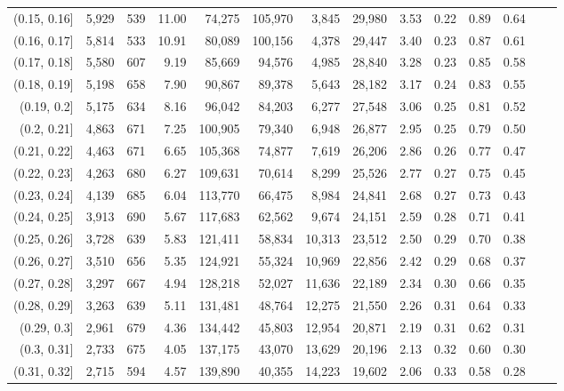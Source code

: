 \begin{tabular}{rrrrrrrrrrrrrr}
(0.15, 0.16]   &  5,929 &  539 &   11.00 &   74,275 &  105,970 &   3,845 &  29,980 &  3.53 &  0.22 &  0.89 &      0.64 \\
(0.16, 0.17]   &  5,814 &  533 &   10.91 &   80,089 &  100,156 &   4,378 &  29,447 &  3.40 &  0.23 &  0.87 &      0.61 \\
(0.17, 0.18]   &  5,580 &  607 &    9.19 &   85,669 &   94,576 &   4,985 &  28,840 &  3.28 &  0.23 &  0.85 &      0.58 \\
(0.18, 0.19]   &  5,198 &  658 &    7.90 &   90,867 &   89,378 &   5,643 &  28,182 &  3.17 &  0.24 &  0.83 &      0.55 \\
(0.19, 0.2]    &  5,175 &  634 &    8.16 &   96,042 &   84,203 &   6,277 &  27,548 &  3.06 &  0.25 &  0.81 &      0.52 \\
(0.2, 0.21]    &  4,863 &  671 &    7.25 &  100,905 &   79,340 &   6,948 &  26,877 &  2.95 &  0.25 &  0.79 &      0.50 \\
(0.21, 0.22]   &  4,463 &  671 &    6.65 &  105,368 &   74,877 &   7,619 &  26,206 &  2.86 &  0.26 &  0.77 &      0.47 \\
(0.22, 0.23]   &  4,263 &  680 &    6.27 &  109,631 &   70,614 &   8,299 &  25,526 &  2.77 &  0.27 &  0.75 &      0.45 \\
(0.23, 0.24]   &  4,139 &  685 &    6.04 &  113,770 &   66,475 &   8,984 &  24,841 &  2.68 &  0.27 &  0.73 &      0.43 \\
(0.24, 0.25]   &  3,913 &  690 &    5.67 &  117,683 &   62,562 &   9,674 &  24,151 &  2.59 &  0.28 &  0.71 &      0.41 \\
(0.25, 0.26]   &  3,728 &  639 &    5.83 &  121,411 &   58,834 &  10,313 &  23,512 &  2.50 &  0.29 &  0.70 &      0.38 \\
(0.26, 0.27]   &  3,510 &  656 &    5.35 &  124,921 &   55,324 &  10,969 &  22,856 &  2.42 &  0.29 &  0.68 &      0.37 \\
(0.27, 0.28]   &  3,297 &  667 &    4.94 &  128,218 &   52,027 &  11,636 &  22,189 &  2.34 &  0.30 &  0.66 &      0.35 \\
(0.28, 0.29]   &  3,263 &  639 &    5.11 &  131,481 &   48,764 &  12,275 &  21,550 &  2.26 &  0.31 &  0.64 &      0.33 \\
(0.29, 0.3]    &  2,961 &  679 &    4.36 &  134,442 &   45,803 &  12,954 &  20,871 &  2.19 &  0.31 &  0.62 &      0.31 \\
(0.3, 0.31]    &  2,733 &  675 &    4.05 &  137,175 &   43,070 &  13,629 &  20,196 &  2.13 &  0.32 &  0.60 &      0.30 \\
(0.31, 0.32]   &  2,715 &  594 &    4.57 &  139,890 &   40,355 &  14,223 &  19,602 &  2.06 &  0.33 &  0.58 &      0.28 \\

\end{tabular}
